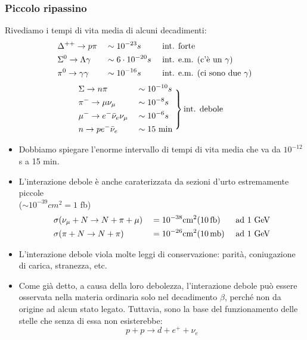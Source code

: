 \subsubsection{Piccolo ripassino}
Rivediamo i tempi di vita media di alcuni decadimenti:
\begin{alignat*}{3}
    &\Delta^{++} \to p\pi &&\sim 10^{-23}s &&\textnormal{int. forte} \\
    &\Sigma^0\to\Lambda\gamma &&\sim6\cdot10^{-20}s \textnormal{ }&& \textnormal{int. e.m. (c'è un }\gamma) \\
    & \pi^0\to\gamma \gamma &&\sim 10^{-16}s && \textnormal{int. e.m. (ci sono due }\gamma)
\end{alignat*}
\begin{align*}
    & \begin{aligned}
       & \Sigma\to n\pi &&\sim10^{-10}s \\
       & \pi^-\to\mu\nu_\mu&&\sim10^{-8}s \\
       & \mu^-\to e^-\bar\nu_e\nu_\mu&&\sim10^{-6}s \\
       & n\to pe^-\bar\nu_e&&\sim15\textnormal{ min}
    \end{aligned}
     \left.\vphantom{\begin{matrix}
    \text{Equazione 7}\\
    \text{Equazione 8}\\
    \text{Equazione 9}\\
    \text{Equazione 10}
    \end{matrix}}\right\} \text{int. debole}
    \end{align*}
\begin{itemize}
    \item Dobbiamo spiegare l'enorme intervallo di tempi di vita media che va da $10^{-12}$ s a 15 min.
    \item L'interazione debole è anche caraterizzata da sezioni d'urto estremamente piccole \\
    ($\sim10^{-39}cm^2=1$ fb)
    \begin{alignat*}{3}
    &\sigma(\nu_\mu+N\to N+\pi+\mu)&&=10^{-38}\textnormal{cm}^2(10\,\textnormal{fb}) &&\textnormal{ ad 1 GeV}\\
    &\sigma(\pi+N\to N+\pi)&&=10^{-26}\textnormal{cm}^2(10\,\textnormal{mb}) &&\textnormal{ ad 1 GeV}
    \end{alignat*}
    \item L'interazione debole viola molte leggi di conservazione: parità, coniugazione di carica, stranezza, etc.
    \item Come già detto, a causa della loro debolezza, l'interazione debole può essere osservata nella materia ordinaria solo nel decadimento $\beta$, perché non da origine ad alcun stato legato. Tuttavia, sono la base del funzionamento delle stelle che senza di essa non esisterebbe:
    \begin{equation*}
    p+p\to d+e^++\nu_e
    \end{equation*}
\end{itemize}
